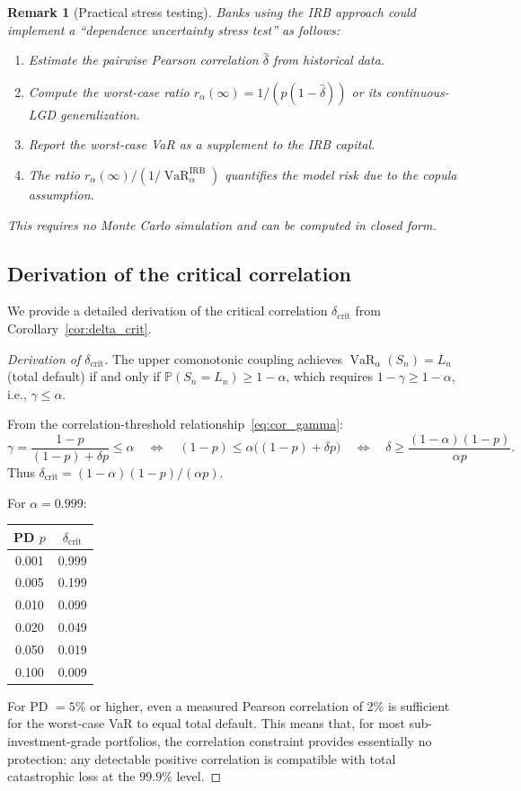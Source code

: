 \documentclass[11pt]{article}
\newtheorem{remark}[theorem]{Remark}
\theoremstyle{definition}
\newcommand{\VaR}{\operatorname{VaR}}
\newcommand{\PP}{\mathbb{P}}
\newcommand{\1}{\mathbf{1}}
\begin{document}
\begin{remark}[Practical stress testing]
Banks using the IRB approach could implement a ``dependence uncertainty stress test'' as follows:
\begin{enumerate}
  \item Estimate the pairwise Pearson correlation $\hat{\delta}$ from historical data.
  \item Compute the worst-case ratio $r_\alpha(\infty) = 1/(p(1-\hat{\delta}))$ or its continuous-LGD generalization.
  \item Report the worst-case VaR as a supplement to the IRB capital.
  \item The ratio $r_\alpha(\infty) / (1/\VaR_\alpha^{\mathrm{IRB}})$ quantifies the model risk due to the copula assumption.
\end{enumerate}
This requires no Monte Carlo simulation and can be computed in closed form.
\end{remark}

\subsection{Derivation of the critical correlation}\label{app:delta_crit}

We provide a detailed derivation of the critical correlation $\delta_{\mathrm{crit}}$ from Corollary~\ref{cor:delta_crit}.

\begin{proof}[Derivation of $\delta_{\mathrm{crit}}$]
The upper comonotonic coupling achieves $\VaR_\alpha(S_n) = L_n$ (total default) if and only if $\PP(S_n = L_n) \geq 1 - \alpha$, which requires $1 - \gamma \geq 1 - \alpha$, i.e., $\gamma \leq \alpha$.

From the correlation-threshold relationship~\eqref{eq:cor_gamma}:
\[
  \gamma = \frac{1-p}{(1-p) + \delta p} \leq \alpha
  \quad\Longleftrightarrow\quad
  (1-p) \leq \alpha\bigl((1-p) + \delta p\bigr)
  \quad\Longleftrightarrow\quad
  \delta \geq \frac{(1-\alpha)(1-p)}{\alpha p}.
\]
Thus $\delta_{\mathrm{crit}} = (1-\alpha)(1-p)/(\alpha p)$.

For $\alpha = 0.999$:
\begin{center}
\begin{tabular}{cc}
\toprule
PD $p$ & $\delta_{\mathrm{crit}}$ \\
\midrule
0.001 & 0.999 \\
0.005 & 0.199 \\
0.010 & 0.099 \\
0.020 & 0.049 \\
0.050 & 0.019 \\
0.100 & 0.009 \\
\bottomrule
\end{tabular}
\end{center}
For PD $= 5\%$ or higher, even a measured Pearson correlation of 2\% is sufficient for the worst-case VaR to equal total default. This means that, for most sub-investment-grade portfolios, the correlation constraint provides essentially no protection: any detectable positive correlation is compatible with total catastrophic loss at the $99.9\%$ level.
\end{proof}
\end{document}
